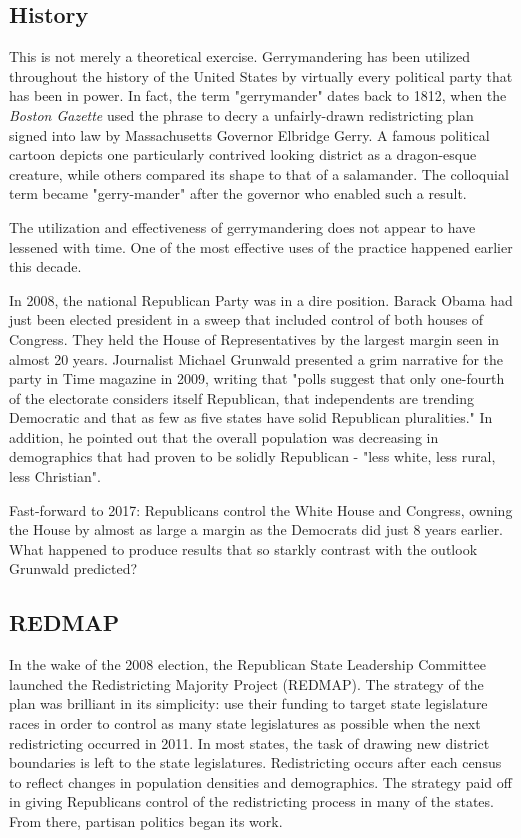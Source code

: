 \documentclass[sigconf]{acmart}
\begin{document}
\subsection{History}
This is not merely a theoretical exercise. Gerrymandering has been utilized throughout the history of the United States by virtually every political party that has been in power. In fact, the term "gerrymander" dates back to 1812, when the \textit{Boston Gazette} used the phrase to decry a unfairly-drawn redistricting plan signed into law by Massachusetts Governor Elbridge Gerry.\cite{griffith} A famous political cartoon depicts one particularly contrived looking district as a dragon-esque creature, while others compared its shape to that of a salamander. The colloquial term became "gerry-mander" after the governor who enabled such a result.

The utilization and effectiveness of gerrymandering does not appear to have lessened with time. One of the most effective uses of the practice happened earlier this decade. 

In 2008, the national Republican Party was in a dire position. Barack Obama had just been elected president in a sweep that included control of both houses of Congress. They held the House of Representatives by the largest margin seen in almost 20 years.\cite{house} Journalist Michael Grunwald presented a grim narrative for the party in Time magazine in 2009, writing that "polls suggest that only one-fourth of the electorate considers itself Republican, that independents are trending Democratic and that as few as five states have solid Republican pluralities." In addition, he pointed out that the overall population was decreasing in demographics that had proven to be solidly Republican - "less white, less rural, less Christian".\cite{distress}

Fast-forward to 2017: Republicans control the White House and Congress, owning the House by almost as large a margin as the Democrats did just 8 years earlier.\cite{house} What happened to produce results that so starkly contrast with the outlook Grunwald predicted?

\subsection{REDMAP}

In the wake of the 2008 election, the Republican State Leadership Committee launched the Redistricting Majority Project (REDMAP).\cite{redmap} The strategy of the plan was brilliant in its simplicity: use their funding to target state legislature races in order to control as many state legislatures as possible when the next redistricting occurred in 2011. In most states, the task of drawing new district boundaries is left to the state legislatures.\cite{maps} Redistricting occurs after each census to reflect changes in population densities and demographics. The strategy paid off in giving Republicans control of the redistricting process in many of the states. From there, partisan politics began its work.
\end{document}
